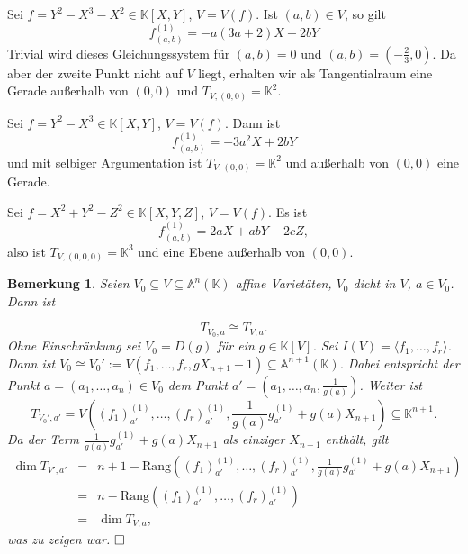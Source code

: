 \documentclass[11pt]{book}
\newtheorem{remark}[theorem]{Bemerkung}
\theoremstyle{nonumberbreak}
\newenvironment{pr}[1][]{\ifthenelse{\equal{#1}{}}{\proof}{\proof[#1]}\rm}{\endproof}
\newenvironment{ex}[1][]{\ifthenelse{\equal{#1}{}}{\example}{\example[#1]}\rm}{\endexample}
\begin{document}
\begin{spacing}{1.3}
\begin{ex}

\begin{compactenum}
\item Sei $f=Y^2-X^3-X^2 \in \mathbb{K}[X,Y]$, $V=V(f)$. Ist $(a,b) \in V$, so gilt
$$f_{(a,b)}^{(1)} = -a (3a+2)X+2bY$$
Trivial wird dieses Gleichungssystem für $(a,b)=0$ und $(a,b)=\left(-\frac{2}{3}, 0 \right)$. Da aber der zweite Punkt nicht auf $V$ liegt, erhalten wir als Tangentialraum eine Gerade außerhalb von $(0,0)$ und $T_{V,(0,0)} = \mathbb{K}^2$. 
\item Sei $f= Y^2-X^3 \in \mathbb{K}[X,Y]$, $V=V(f)$. Dann ist 
$$f_{(a,b)}^{(1)} = -3a^2 X + 2bY$$
und mit selbiger Argumentation ist $T_{V,(0,0)}= \mathbb{K}^2$ und außerhalb von $(0,0)$ eine Gerade.
\item Sei $f=X^2+Y^2-Z^2 \in \mathbb{K}[X,Y,Z]$, $V=V(f)$. Es ist 
$$f_{(a,b)}^{(1)} = 2aX + abY - 2cZ,$$
also ist $T_{V,(0,0,0)}= \mathbb{K}^3$ und eine Ebene außerhalb von $(0,0)$. 
\end{compactenum}
\end{ex}


\begin{remark}   %
 Seien $V_0 \subseteq V \subseteq \mathbb{A}^n(\mathbb{K})$ affine Varietäten, $V_0$ dicht in $V$, $a \in V_0$. Dann ist 

$$T_{V_0,a} \cong T_{V,a}.$$
\begin{pr}
Ohne Einschränkung sei $V_0= D(g)$ für ein $g \in \mathbb{K}[V]$. Sei $I(V)= \langle f_1, \ldots, f_r \rangle$. Dann ist $V_0 \cong V_0':= V(f_1, \ldots, f_r, g X_{n+1}-1) \subseteq \mathbb{A}^{n+1}(\mathbb{K})$. Dabei entspricht der Punkt $a=(a_1,\ldots, a_n) \in V_0$ dem Punkt $a'=\left(a_1, \ldots, a_n, \frac{1}{g(a)}\right)$. Weiter ist 
$$T_{V_0', a'} = V\left((f_1)_{a'}^{(1)}, \ldots, (f_r)_{a'}^{(1)}, \frac{1}{g(a)} g_{a'}^{(1)} + g(a) X_{n+1} \right) \subseteq \mathbb{K}^{n+1}.$$
Da der Term $\frac{1}{g(a)} g_{a'}^{(1)} + g(a) X_{n+1}$ als einziger $X_{n+1}$ enthält, gilt
$$
\begin{array}{rcl}
 \dim T_{V',a'} & = &  n+1 - \textrm{Rang} \left( (f_1)_{a'}^{(1)}, \ldots, (f_r)_{a'}^{(1)}, \frac{1}{g(a)} g_{a'}^{(1)} + g(a) X_{n+1} \right) \\
 & = & n- \textrm{Rang} \left( (f_1)_{a'}^{(1)}, \ldots, (f_r)_{a'}^{(1)} \right)\\
&=&  \dim T_{V,a},
\end{array}
$$
was zu zeigen war. $\hfill \Box$
\end{pr}
\end{remark}



\end{spacing}
\end{document}

